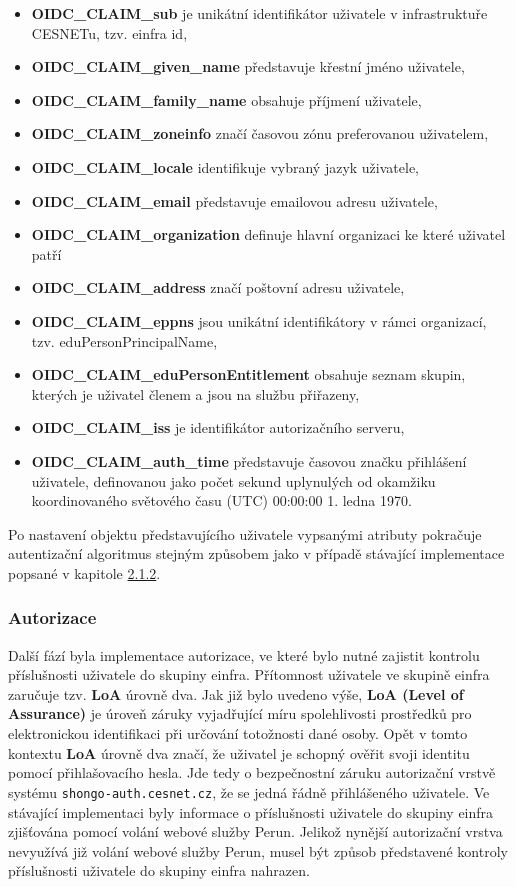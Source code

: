 \documentclass[
  printed, %
  twoside, %
  table,   %
  nolof,     %
  nolot,     %
]{fithesis3}
\begin{document}
\begin{itemize}
    \item \textbf{OIDC\_CLAIM\_sub} je unikátní identifikátor uživatele v infrastruktuře CESNETu, tzv. einfra id,
    \item \textbf{OIDC\_CLAIM\_given\_name} představuje křestní jméno uživatele,
    \item \textbf{OIDC\_CLAIM\_family\_name} obsahuje příjmení uživatele,
    \item \textbf{OIDC\_CLAIM\_zoneinfo} značí časovou zónu preferovanou uživatelem, 
    \item \textbf{OIDC\_CLAIM\_locale} identifikuje vybraný jazyk uživatele,
    \item \textbf{OIDC\_CLAIM\_email} představuje emailovou adresu uživatele,
    \item \textbf{OIDC\_CLAIM\_organization} definuje hlavní organizaci ke které uživatel patří
    \item \textbf{OIDC\_CLAIM\_address} značí poštovní adresu uživatele,
    \item \textbf{OIDC\_CLAIM\_eppns} jsou unikátní identifikátory v rámci organizací, tzv. eduPersonPrincipalName, 
    \item \textbf{OIDC\_CLAIM\_eduPersonEntitlement} obsahuje seznam skupin, kterých je uživatel členem a jsou na službu přiřazeny,
    \item \textbf{OIDC\_CLAIM\_iss} je identifikátor autorizačního serveru,
    \item \textbf{OIDC\_CLAIM\_auth\_time} představuje časovou značku přihlášení uživatele, definovanou jako počet sekund uplynulých od okamžiku koordinovaného světového času (UTC) 00:00:00 1. ledna 1970.
\end{itemize}

Po nastavení objektu představujícího uživatele vypsanými atributy pokračuje autentizační algoritmus stejným způsobem jako v případě stávající implementace popsané v kapitole \hyperref[meetings-old]{2.1.2}.


\subsubsection{Autorizace}
Další fází byla implementace autorizace, ve které bylo nutné zajistit kontrolu příslušnosti uživatele do skupiny einfra. Přítomnost uživatele ve skupině einfra zaručuje tzv. \textbf{LoA} úrovně dva. Jak již bylo uvedeno výše, \textbf{LoA (Level of Assurance)} je úroveň záruky vyjadřující míru spolehlivosti prostředků pro elektronickou identifikaci při určování totožnosti dané osoby. Opět v tomto kontextu \textbf{LoA} úrovně dva značí, že uživatel je schopný ověřit svoji identitu pomocí přihlašovacího hesla. Jde tedy o bezpečnostní záruku autorizační vrstvě systému \texttt{shongo-auth.cesnet.cz}, že se jedná řádně přihlášeného uživatele. Ve stávající implementaci byly informace o příslušnosti uživatele do skupiny einfra zjišťována pomocí volání webové služby Perun. Jelikož nynější autorizační vrstva nevyužívá již volání webové služby Perun, musel být způsob představené kontroly příslušnosti uživatele do skupiny einfra nahrazen. 
\end{document}
